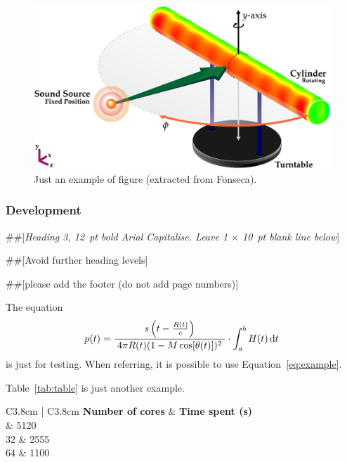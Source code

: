 \documentclass[10pt, a4paper, oneside]{article}
\begin{document}
\begin{figure}[H]
	\centering
	\includegraphics[width=0.75\linewidth]{figs/Measurement-Scheme-Fonseca-2013.pdf}%
	\caption{Just an example of figure (extracted from Fonseca\cite{Fonseca-2013}).}%
	\label{fig:beamforming}%
\end{figure}

\subsubsection{Development}

\#\#[\textit{Heading 3, 12~pt bold Arial Capitalise. Leave 1 $\times$ 10~pt blank line below}]

\#\#[Avoid further heading levels]

\#\#[please add the footer (do not add page numbers)]

The equation
\begin{equation}
p(t) = \frac{s\left( t-\frac{R(t)}{c} \right )}{\; 4\pi R(t)(1-M\,\text{cos}[\theta(t)])^2 \;} \cdot \int_a^b H(t) \operatorname{d\!} t\,
\label{eq:example}
\end{equation}
%
is just for testing. When referring, it is possible to use Equation~\eqref{eq:example}.

Table~\ref{tab:table} is just another example.

\begin{table}[H]
  \centering 
  \caption{Example of table.}
	\fontsize{11}{12}\selectfont 
    \begin{tabular}{C{3.8cm} | C{3.8cm}}
    \toprule
    \textbf{ Number of cores } & \textbf{ Time spent (s)} \\
	   & 5120\\
		 32	& 2555\\
		64 & 1100\\
    \bottomrule
    \end{tabular}
    \label{tab:table}
\end{table}%
\end{document}
